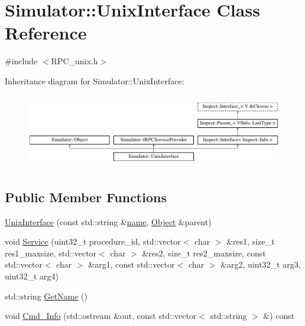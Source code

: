 \hypertarget{class_simulator_1_1_unix_interface}{\section{Simulator\+:\+:Unix\+Interface Class Reference}
\label{class_simulator_1_1_unix_interface}
}


{\ttfamily \#include $<$R\+P\+C\+\_\+unix.\+h$>$}

Inheritance diagram for Simulator\+:\+:Unix\+Interface\+:\begin{figure}[H]
\begin{center}
\leavevmode
\includegraphics[height=3.289281cm]{class_simulator_1_1_unix_interface}
\end{center}
\end{figure}
\subsection*{Public Member Functions}
\begin{DoxyCompactItemize}
\item 
\hyperlink{class_simulator_1_1_unix_interface_a0f1b04f32ffbe45f857b98e5d5213578}{Unix\+Interface} (const std\+::string \&\hyperlink{mtconf_8c_a8f8f80d37794cde9472343e4487ba3eb}{name}, \hyperlink{class_simulator_1_1_object}{Object} \&parent)
\item 
void \hyperlink{class_simulator_1_1_unix_interface_a106c0313f63e7ce5efe33b30de899414}{Service} (uint32\+\_\+t procedure\+\_\+id, std\+::vector$<$ char $>$ \&res1, size\+\_\+t res1\+\_\+maxsize, std\+::vector$<$ char $>$ \&res2, size\+\_\+t res2\+\_\+maxsize, const std\+::vector$<$ char $>$ \&arg1, const std\+::vector$<$ char $>$ \&arg2, uint32\+\_\+t arg3, uint32\+\_\+t arg4)
\item 
std\+::string \hyperlink{class_simulator_1_1_unix_interface_aaa535cdc1ec588c422a54394544a0ec5}{Get\+Name} ()
\item 
void \hyperlink{class_simulator_1_1_unix_interface_ac9fd78254225aed713d16e6390435a11}{Cmd\+\_\+\+Info} (std\+::ostream \&out, const std\+::vector$<$ std\+::string $>$ \&) const 
\end{DoxyCompactItemize}



